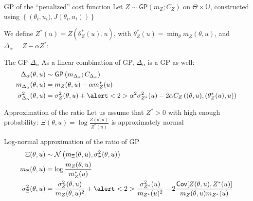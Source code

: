 \documentclass[10pt,aspectratio=169,usepdftitle=false]{beamer}
\newcommand{\Uspace}{\mathbb{U}}
\newcommand{\Kspace}{\Theta}
\newcommand{\GP}{\mathsf{GP}}
\newcommand{\Cov}{\textsf{Cov}}
\newcommand{\kk}{\theta}
\newcommand{\uu}{u}
\begin{document}
\begin{frame}{GP of the ``penalized'' cost function}
  Let
  $Z \sim \GP\left(m_Z; C_Z\right) \text{ on } \Kspace \times \Uspace$, constructed using $\left\{\left(\kk_i,\uu_i), J(\kk_i, \uu_i)\right)\right\}$

  We define $Z^*(\uu)=Z(\kk^*_Z(\uu), \uu)$, with $\kk^*_Z(\uu) = \min_{\kk} m_Z(\kk, \uu)$,
  and $\Delta_{\alpha} = Z - \alpha Z^*$:
  \begin{block}{The GP $\Delta_\alpha$}
    As a linear combination of GP, $\Delta_{\alpha}$ is a GP as well:
  \begin{align}
    \Delta_{\alpha}(\kk, \uu) &\sim \GP\left(m_{\Delta_{\alpha}};C_{\Delta_\alpha}\right) \\
    m_{\Delta_\alpha}(\kk,\uu)   &= m_Z(\kk, \uu) - \alpha m_Z^*(\uu) \\
    \sigma^2_{\Delta_\alpha}(\kk, \uu) &= \sigma^2_{Z}(\kk, \uu) +  \alert<2>{\alpha^2\sigma^2_{Z^*}(\uu)}- 2\alpha C_Z\left((\kk, \uu), ({\kk}_Z^ *(\uu), \uu)\right)
  \end{align}
\end{block}
\end{frame}


\begin{frame}{Approximation of the ratio}
  Let us assume that $Z^*>0$ with high enough probability:
  $\Xi(\kk, \uu) = \log \frac{Z(\kk,\uu)}{Z^*(\uu)}$ is approximately normal
  \begin{block}{Log-normal approximation of the ratio of GP}
    \begin{align}
      \Xi(\kk, \uu) &\sim \mathcal{N}\left(m_\Xi(\kk,\uu), \sigma^2_\Xi(\kk, \uu) \right) \\
      m_\Xi(\kk, \uu) &= \log \frac{m_Z(\kk, \uu)}{m_Z^*(\uu)} \\
      \sigma^2_\Xi(\kk, \uu) &= \frac{\sigma^2_{Z}(\kk, \uu)}{m_{Z}(\kk,\uu)^2} + \alert<2>{\frac{\sigma^2_{Z^*}(\uu)}{m_{Z^*}(\uu)^2}} - 2 \frac{\Cov[Z(\kk, \uu), Z^*(\uu)]}{m_Z(\kk, \uu)m_{Z^*}(\uu)} 
    \end{align}
  \end{block}
\end{frame}
\end{document}
